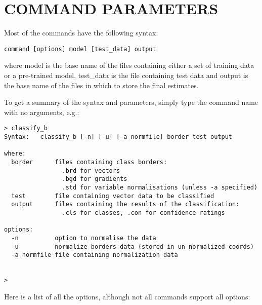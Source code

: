 \documentclass[12pt]{article}
\begin{document}
\section{COMMAND PARAMETERS}

Most of the commands have the following syntax:

\begin{verbatim}
command [options] model [test_data] output
\end{verbatim}

where model is the base name of the files containing either a set of training data or a pre-trained model, test_data is the file containing test data and output is the base name of the files in which to store the final estimates.  

To get a summary of the syntax and parameters, simply type the command name with no arguments, e.g.:

\begin{verbatim}
> classify_b
Syntax:   classify_b [-n] [-u] [-a normfile] border test output

where:
  border      files containing class borders:
                .brd for vectors
                .bgd for gradients
                .std for variable normalisations (unless -a specified)
  test        file containing vector data to be classified
  output      files containing the results of the classification:
                .cls for classes, .con for confidence ratings

options:
  -n          option to normalise the data
  -u          normalize borders data (stored in un-normalized coords)
  -a normfile file containing normalization data


>
\end{verbatim}

Here is a list of all the options, although not all commands support all options:
\end{document}
